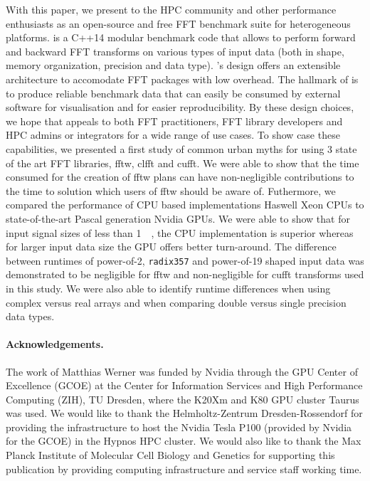
With this paper, we present \gearshifft{} to the HPC community and other performance enthusiasts as an open-source and free FFT benchmark suite for heterogeneous platforms. \gearshifft{} is a C++14 modular benchmark code that allows to perform forward and backward FFT transforms on various types of input data (both in shape, memory organization, precision and data type). \gearshifft{}'s design offers an extensible architecture to accomodate FFT packages with low overhead. The hallmark of \gearshifft{} is to produce reliable benchmark data that can easily be consumed by external software for visualisation and for easier reproducibility. By these design choices, we hope that \gearshifft{} appeals to both FFT practitioners, FFT library developers and HPC admins or integrators for a wide range of use cases. To show case these capabilities, we presented a first study of common urban myths for using 3 state of the art FFT libraries, fftw, clfft and cufft. We were able to show that the time consumed for the creation of fftw plans can have non-negligible contributions to the time to solution which users of fftw should be aware of. Futhermore, we compared the performance of CPU based implementations Haswell Xeon CPUs to state-of-the-art Pascal generation Nvidia GPUs. We were able to show that for input signal sizes of less than \SI{1}{\mebi\byte}, the CPU implementation is superior whereas for larger input data size the GPU offers better turn-around. The difference between runtimes of power-of-2, {\tt radix357} and power-of-19 shaped input data was demonstrated to be negligible for fftw and non-negligible for cufft transforms used in this study. We were also able to identify runtime differences when using complex versus real arrays and when comparing double versus single precision data types.     

\paragraph{Acknowledgements.} The work of Matthias Werner was funded by Nvidia through the GPU Center of Excellence (GCOE) at the Center for Information Services and High Performance Computing (ZIH), TU Dresden, where the K20Xm and K80 GPU cluster Taurus was used. We would like to thank the Helmholtz-Zentrum Dresden-Rossendorf for providing the infrastructure to host the Nvidia Tesla P100 (provided by Nvidia for the GCOE) in the Hypnos HPC cluster. We would also like to thank the Max Planck Institute of Molecular Cell Biology and Genetics for supporting this publication by providing computing infrastructure and service staff working time.
